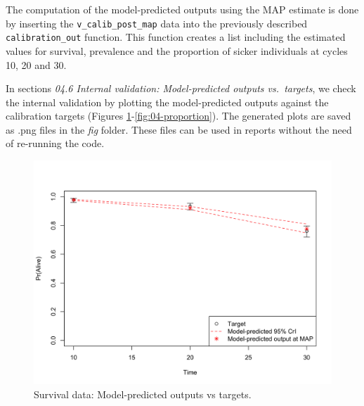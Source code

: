 \documentclass[]{book}
\begin{document}
The computation of the model-predicted outputs using the MAP estimate is done by inserting the \texttt{v\_calib\_post\_map} data into the previously described \texttt{calibration\_out} function. This function creates a list including the estimated values for survival, prevalence and the proportion of sicker individuals at cycles 10, 20 and 30.

In sections \emph{04.6 Internal validation: Model-predicted outputs vs.~targets}, we check the internal validation by plotting the model-predicted outputs against the calibration targets (Figures \ref{fig:04-surv}-\ref{fig:04-proportion}). The generated plots are saved as .png files in the \emph{fig} folder. These files can be used in reports without the need of re-running the code.

\begin{figure}

{\centering \includegraphics[width=1\linewidth]{../figs/04_posterior_vs_targets_survival} 

}

\caption{Survival data: Model-predicted outputs vs targets.}\label{fig:04-surv}
\end{figure}
\end{document}
